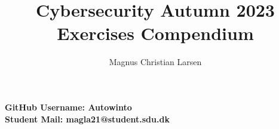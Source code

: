 \documentclass{article}
\title{%
    \bf{Cybersecurity Autumn 2023} \\
    \large Exercises Compendium
}
\author{Magnus Christian Larsen}
\begin{document}
\lstset{
    numbers=left,
    frame=line,
    breaklines=true
}


\maketitle
\vspace*{\fill}
\begin{center}
    \bf{%
        GitHub Username: Autowinto\\
        Student Mail: magla21@student.sdu.dk}
\end{center}
\newpage
\tableofcontents
\newpage








\end{document}
